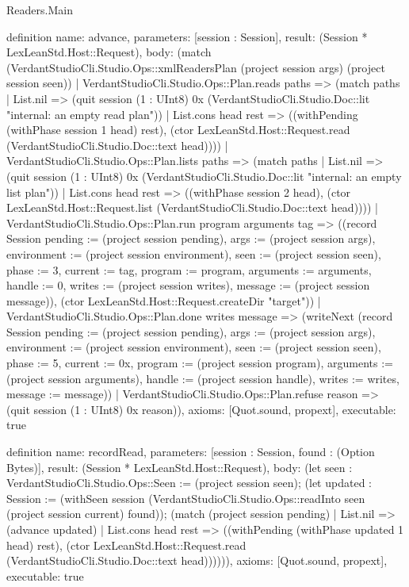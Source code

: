 \begin{lexlean}{Readers.Main}
\begin{semanticmodule}
definition{
  name: advance,
  parameters: [session : Session],
  result: (Session * LexLeanStd.Host::Request),
  body: (match (VerdantStudioCli.Studio.Ops::xmlReadersPlan (project session args) (project session seen))
    | VerdantStudioCli.Studio.Ops::Plan.reads paths => (match paths
      | List.nil => (quit session (1 : UInt8) 0x (VerdantStudioCli.Studio.Doc::lit "internal: an empty read plan\n"))
      | List.cons head rest => ((withPending (withPhase session 1 head) rest), (ctor LexLeanStd.Host::Request.read (VerdantStudioCli.Studio.Doc::text head))))
    | VerdantStudioCli.Studio.Ops::Plan.lists paths => (match paths
      | List.nil => (quit session (1 : UInt8) 0x (VerdantStudioCli.Studio.Doc::lit "internal: an empty list plan\n"))
      | List.cons head rest => ((withPhase session 2 head), (ctor LexLeanStd.Host::Request.list (VerdantStudioCli.Studio.Doc::text head))))
    | VerdantStudioCli.Studio.Ops::Plan.run program arguments tag => ((record Session {pending := (project session pending), args := (project session args), environment := (project session environment), seen := (project session seen), phase := 3, current := tag, program := program, arguments := arguments, handle := 0, writes := (project session writes), message := (project session message)}), (ctor LexLeanStd.Host::Request.createDir "target"))
    | VerdantStudioCli.Studio.Ops::Plan.done writes message => (writeNext (record Session {pending := (project session pending), args := (project session args), environment := (project session environment), seen := (project session seen), phase := 5, current := 0x, program := (project session program), arguments := (project session arguments), handle := (project session handle), writes := writes, message := message}))
    | VerdantStudioCli.Studio.Ops::Plan.refuse reason => (quit session (1 : UInt8) 0x reason)),
  axioms: [Quot.sound, propext],
  executable: true
}

definition{
  name: recordRead,
  parameters: [session : Session, found : (Option Bytes)],
  result: (Session * LexLeanStd.Host::Request),
  body: (let seen : VerdantStudioCli.Studio.Ops::Seen := (project session seen); (let updated : Session := (withSeen session (VerdantStudioCli.Studio.Ops::readInto seen (project session current) found)); (match (project session pending)
    | List.nil => (advance updated)
    | List.cons head rest => ((withPending (withPhase updated 1 head) rest), (ctor LexLeanStd.Host::Request.read (VerdantStudioCli.Studio.Doc::text head)))))),
  axioms: [Quot.sound, propext],
  executable: true
}


\end{semanticmodule}
\end{lexlean}
